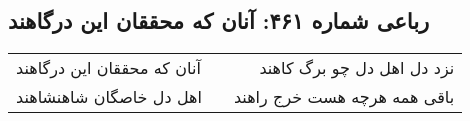 \begin{center}
\section*{رباعی شماره ۴۶۱: آنان که محققان این درگاهند}
\label{sec:0461}
\begin{longtable}{l p{0.5cm} r}
آنان که محققان این درگاهند
&&
نزد دل اهل دل چو برگ کاهند
\\
اهل دل خاصگان شاهنشاهند
&&
باقی همه هرچه هست خرج راهند
\\
\end{longtable}
\end{center}
